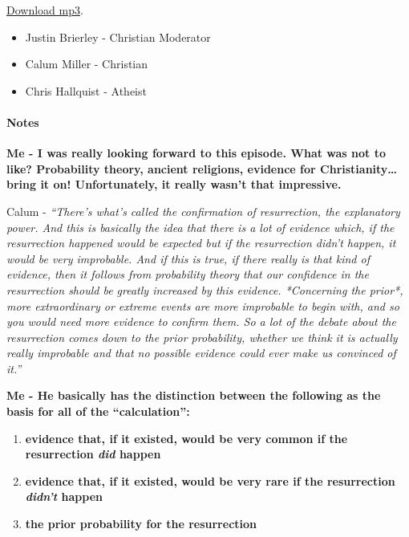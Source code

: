\documentclass{tufte-book}
\begin{document}
\href{http://media.premier.org.uk/unbelievable/d8367d64-5f9f-496f-967a-ff4659e83027.mp3}{Download
mp3}.

\begin{itemize}
\itemsep1pt\parskip0pt
\item
  Justin Brierley - Christian Moderator
\item
  Calum Miller - Christian
\item
  Chris Hallquist - Atheist
\end{itemize}

\paragraph{Notes}\label{notes}

\textbf{Me - I was really looking forward to this episode. What was not
to like? Probability theory, ancient religions, evidence for
Christianity\ldots{}bring it on! Unfortunately, it really wasn't that
impressive.}

Calum - \emph{``There's what's called the confirmation of resurrection,
the explanatory power. And this is basically the idea that there is a
lot of evidence which, if the resurrection happened would be expected
but if the resurrection didn't happen, it would be very improbable. And
if this is true, if there really is that kind of evidence, then it
follows from probability theory that our confidence in the resurrection
should be greatly increased by this evidence. *Concerning the
prior*, more extraordinary or extreme events are more improbable to
begin with, and so you would need more evidence to confirm them. So a
lot of the debate about the resurrection comes down to the prior
probability, whether we think it is actually really improbable and that
no possible evidence could ever make us convinced of it.''}

\textbf{Me - He basically has the distinction between the following as
the basis for all of the ``calculation'':}

\begin{enumerate}
\def\labelenumi{\arabic{enumi}.}
\itemsep1pt\parskip0pt
\item
  \textbf{evidence that, if it existed, would be very common if the
  resurrection \emph{did} happen}
\item
  \textbf{evidence that, if it existed, would be very rare if the
  resurrection \emph{didn't} happen}
\item
  \textbf{the prior probability for the resurrection}
\end{enumerate}
\end{document}

